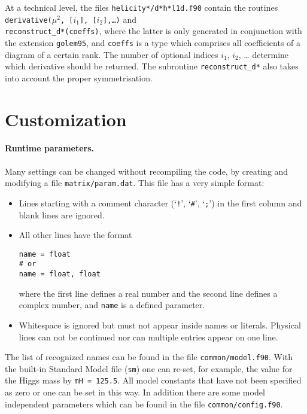 At a technical level, 
the files \texttt{helicity*/d*h*l1d.f90} contain the routines
\texttt{derivative($\mu^2$, [$i_1$], [$i_2$],\dots)} and\\
\texttt{reconstruct\_d*(coeffs)}, where the latter is only generated in
conjunction with the extension \texttt{golem95}, and \texttt{coeffs} is
a type which comprises all coefficients of a diagram of a certain rank.
The number of optional indices $i_1$, $i_2$, \dots 
determine which derivative should be returned. The subroutine
\texttt{reconstruct\_d*} also takes into account the proper symmetrisation.

\section{Customization}\label{sec:Customization}
\paragraph{Runtime parameters.}
Many settings can be changed without recompiling the code, by
creating and modifying a file \texttt{matrix/param.dat}.
This file has a very simple format:
\begin{itemize}
\item Lines starting with a comment character (`\texttt{!}', `\texttt{\#}', `\texttt{;}')
      in the first column and blank lines are ignored.
\item All other lines have the format
\begin{lstlisting}[style=in]
name = float
# or
name = float, float
\end{lstlisting}
      where the first line defines a real number and the second
      line defines a complex number, and \texttt{name} is a defined
      parameter.
\item Whitespace is ignored but must not appear inside names or
      literals. Physical lines can not be continued nor can
      multiple entries appear on one line.
\end{itemize}
The list of recognized names can be found in the file
\texttt{common/model.f90}. 
With the built-in Standard Model file (\texttt{sm}) one
can re-set, for example, the value for the Higgs mass by 
\texttt{mH = 125.5}.
All model constants that have not been specified as zero or one
can be set in this way. 
In addition there are some model independent parameters which can be found in the file 
\texttt{common/config.f90}.

